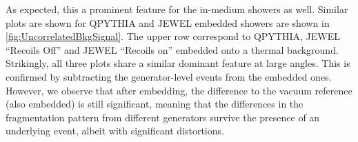 As expected, this a prominent feature for the in-medium showers as well.
Similar plots are shown for QPYTHIA and JEWEL embedded showers are shown in \autoref{fig:UncorrelatedBkgSignal}. The upper row correspond to QPYTHIA, JEWEL ``Recoils Off'' and JEWEL ``Recoils on'' embedded onto a thermal background. 
Strikingly, all three plots share a similar dominant feature at large angles. This is confirmed by subtracting the generator-level events from the embedded ones. However, we observe that after embedding, the difference to the vacuum reference (also embedded) is still significant, meaning that the differences in the fragmentation pattern from different generators survive the presence of an underlying event, albeit with significant distortions.

